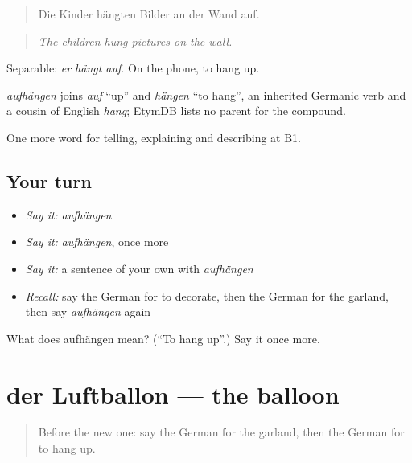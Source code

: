\begin{quote}
Die Kinder hängten Bilder an der Wand auf.
\end{quote}

\begin{quote}
\emph{The children hung pictures on the wall.}
\end{quote}

Separable: \emph{er hängt auf}. On the phone, to hang up.

\begin{cousinweb}
\emph{aufhängen} joins \emph{auf} \textquotedblleft{}up\textquotedblright{} and \emph{hängen} \textquotedblleft{}to hang\textquotedblright{}, an inherited Germanic verb and a cousin of English \emph{hang}; EtymDB lists no parent for the compound.
\end{cousinweb}

\begin{grammarlens}[title={What you've built}]
One more word for telling, explaining and describing at B1.
\end{grammarlens}

\subsection*{Your turn}
\begin{itemize}
\raggedright
  \item \emph{Say it:} \emph{aufhängen}
  \item \emph{Say it:} \emph{aufhängen}, once more
  \item \emph{Say it:} a sentence of your own with \emph{aufhängen}
  \item \emph{Recall:} say the German for to decorate, then the German for the garland, then say \emph{aufhängen} again
\end{itemize}

\begin{tcolorbox}[breakable,colback=teal!4,colframe=teal!35!black,title={Before you move on}]
What does aufhängen mean? (\textquotedblleft{}To hang up\textquotedblright{}.) Say it once more.
\end{tcolorbox}
\section[der Luftballon]{der Luftballon — the balloon}

\label{lesson:GE-C309-luftballon}



\begin{quote}
Before the new one: say the German for the garland, then the German for to hang up.
\end{quote}

